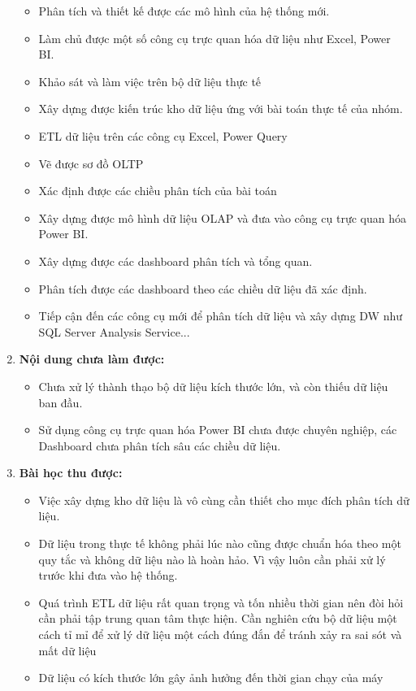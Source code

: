 \begin{enumerate}
\begin{itemize}[label=$-$]
    \item Phân tích và thiết kế được các mô hình của hệ thống mới.
    \item Làm chủ được một số công cụ trực quan hóa dữ liệu như Excel, Power BI.
    \item Khảo sát và làm việc trên bộ dữ liệu thực tế
    \item Xây dựng được kiến trúc kho dữ liệu ứng với bài toán thực tế của nhóm.
    \item ETL dữ liệu trên các công cụ Excel, Power Query
    \item Vẽ được sơ đồ OLTP
    \item Xác định được các chiều phân tích của bài toán
    \item  Xây dựng được mô hình dữ liệu OLAP và đưa vào công cụ trực quan hóa Power BI.
    \item Xây dựng được các dashboard phân tích và tổng quan.
    \item Phân tích được các dashboard theo các chiều dữ liệu đã xác định.
    \item Tiếp cận đến các công cụ mới để phân tích dữ liệu và xây dựng DW
như SQL Server Analysis Service...
\end{itemize}
\item \textbf{Nội dung chưa làm được:}
\begin{itemize}[label=$-$]
    \item Chưa xử lý thành thạo bộ dữ liệu kích thước lớn, và còn thiếu dữ liệu ban đầu.
    \item Sử dụng công cụ trực quan hóa Power BI chưa được chuyên nghiệp, các Dashboard chưa phân tích sâu các chiều dữ liệu.
\end{itemize}
\item \textbf{Bài học thu được:}
\begin{itemize}[label=$-$]
    \item Việc xây dựng kho dữ liệu là vô cùng cần thiết cho mục đích phân tích dữ liệu.
    \item Dữ liệu trong thực tế không phải lúc nào cũng được chuẩn hóa theo một
quy tắc và không dữ liệu nào là hoàn hảo. Vì vậy luôn cần phải xử lý
trước khi đưa vào hệ thống.
\item Quá trình ETL dữ liệu rất quan trọng và tốn nhiều thời gian nên đòi
hỏi cần phải tập trung quan tâm thực hiện. Cần nghiên cứu bộ dữ liệu
một cách tỉ mỉ để xử lý dữ liệu một cách đúng đắn để tránh xảy ra sai
sót và mất dữ liệu
\item Dữ liệu có kích thước lớn gây ảnh hưởng đến thời gian chạy của máy

\end{itemize}
\end{enumerate}
